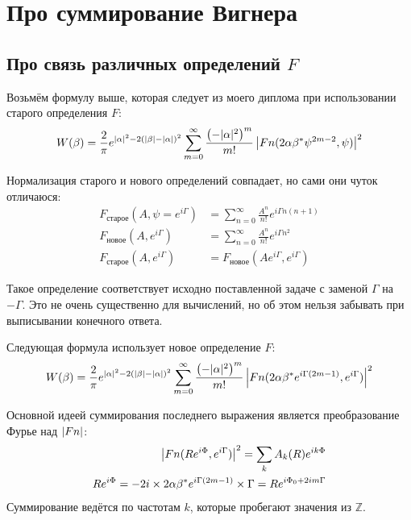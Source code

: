 \documentclass[a4paper, 12pt]{article}
\newenvironment{eqw}{\begin{equation} \begin{aligned}}   
    {\end{aligned}    \end{equation}}
\begin{document}
\section{Про суммирование Вигнера}
\subsection*{Про связь различных определений $F$}
Возьмём формулу выше, которая следует из моего диплома при использовании старого определения $F$:
\begin{equation}\label{QtoW}
	\begin{aligned}
		W(\beta) = \frac{2}{\pi}e^{\abs{\alpha}^2-2\left(\abs{\beta} - \abs{\alpha}\right)^2}\sum\limits_{m=0}^{\infty} \frac{\left(-|\alpha|^2\right)^m}{m!}\left|Fn(2\alpha \beta^*\psi^{2m-2}, \psi)\right|^2
	\end{aligned}
\end{equation}

Нормализация старого и нового определений совпадает, но сами они чуток отличаюся:
\begin{eqw}
     F_{\text{старое}}(A, \psi = e^{i\Gamma}) &= \sum\limits_{n=0}^{\infty} \frac{A^n}{n!}e^{i\Gamma n(n+1)}\\
     F_{\text{новое}}(A, e^{i\Gamma}) &= \sum\limits_{n=0}^{\infty} \frac{A^n}{n!}e^{i\Gamma n^2}\\
     F_{\text{старое}}(A, e^{i\Gamma}) &= F_{\text{новое}}(Ae^{i\Gamma}, e^{i\Gamma})
\end{eqw}

Такое определение соответствует исходно поставленной задаче с заменой $\Gamma$ на $-\Gamma$. Это не очень существенно для вычислений, но об этом нельзя забывать при выписывании конечного ответа.

Следующая формула использует новое определение $F$:
\begin{eqw}
    W(\beta) = \frac{2}{\pi}e^{\abs{\alpha}^2-2\left(\abs{\beta} - \abs{\alpha}\right)^2}\sum\limits_{m=0}^{\infty} \frac{\left(-|\alpha|^2\right)^m}{m!}\left|Fn(2\alpha \beta^*e^{i\Gamma(2m-1)}, e^{i\Gamma})\right|^2
\end{eqw}

Основной идеей суммирования последнего выражения является преобразование Фурье над $\abs{Fn}$:
\begin{eqw}
    \abs{Fn(Re^{i\Phi}, e^{i\Gamma})}^2 = \sum\limits_k A_k(R)e^{ik\Phi}\\
    Re^{i\Phi} = -2i\times 2\alpha \beta^*e^{i\Gamma(2m-1)}\times \Gamma = Re^{i\Phi_0+2im\Gamma}
\end{eqw}
Суммирование ведётся по частотам $k$, которые пробегают значения из $\mathbb{Z}$.
\end{document}
